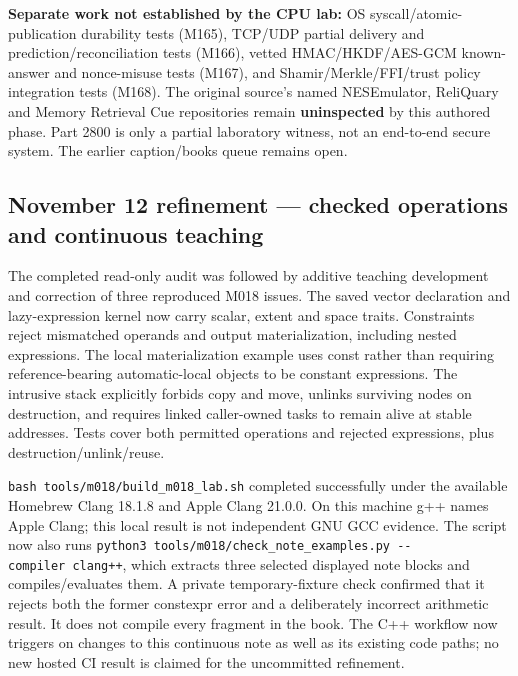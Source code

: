 \textbf{Separate work not established by the CPU lab:} OS syscall/atomic-publication durability tests (M165), TCP/UDP partial delivery and prediction/reconciliation tests (M166), vetted HMAC/HKDF/AES-GCM known-answer and nonce-misuse tests (M167), and Shamir/Merkle/FFI/trust policy integration tests (M168). The original source's named NESEmulator, ReliQuary and Memory Retrieval Cue repositories remain \textbf{uninspected} by this authored phase. Part 2800 is only a partial laboratory witness, not an end-to-end secure system. The earlier caption/books queue remains open.

\subsection{November 12 refinement --- checked operations and continuous teaching}\label{appendix-a103e7846d21-november-12-refinement-checked-operations-and-continuous-teaching}

The completed read-only audit was followed by additive teaching development and correction of three reproduced M018 issues. The saved vector declaration and lazy-expression kernel now carry scalar, extent and space traits. Constraints reject mismatched operands and output materialization, including nested expressions. The local materialization example uses const rather than requiring reference-bearing automatic-local objects to be constant expressions. The intrusive stack explicitly forbids copy and move, unlinks surviving nodes on destruction, and requires linked caller-owned tasks to remain alive at stable addresses. Tests cover both permitted operations and rejected expressions, plus destruction/unlink/reuse.

\texttt{bash\ tools/m018/build\_m018\_lab.sh} completed successfully under the available Homebrew Clang 18.1.8 and Apple Clang 21.0.0. On this machine g++ names Apple Clang; this local result is not independent GNU GCC evidence. The script now also runs \texttt{python3\ tools/m018/check\_note\_examples.py\ -\/-compiler\ clang++}, which extracts three selected displayed note blocks and compiles/evaluates them. A private temporary-fixture check confirmed that it rejects both the former constexpr error and a deliberately incorrect arithmetic result. It does not compile every fragment in the book. The C++ workflow now triggers on changes to this continuous note as well as its existing code paths; no new hosted CI result is claimed for the uncommitted refinement.

